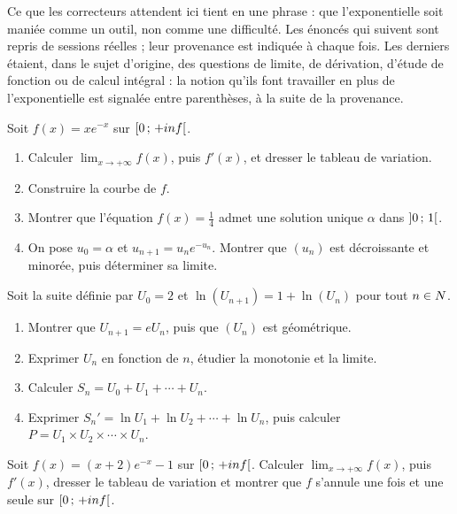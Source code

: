 \begin{annales}
Ce que les correcteurs attendent ici tient en une phrase : que l'exponentielle
soit maniée comme un outil, non comme une difficulté. Les énoncés qui suivent
sont repris de sessions réelles ; leur provenance est indiquée à chaque fois.
Les derniers étaient, dans le sujet d'origine, des questions de limite, de
dérivation, d'étude de fonction ou de calcul intégral : la notion qu'ils font
travailler en plus de l'exponentielle est signalée entre parenthèses, à la
suite de la provenance.

Soit $f(x) = xe^{-x}$ sur $\left[0\,;\,+inf\right[$.
\begin{enumerate}[label=\textbf{\arabic*)}, leftmargin=*, itemsep=0.15em]
  \item Calculer $\lim_{x\to+\infty}f(x)$, puis $f'(x)$, et dresser le tableau
        de variation.
  \item Construire la courbe de $f$.
  \item Montrer que l'équation $f(x) = \frac14$ admet une solution unique
        $\alpha$ dans $\left]0\,;\,1\right[$.
  \item On pose $u_{0} = \alpha$ et $u_{n+1} = u_{n}e^{-u_{n}}$. Montrer que
        $(u_{n})$ est décroissante et minorée, puis déterminer sa limite.
\end{enumerate}

Soit la suite définie par $U_{0} = 2$ et
$\ln\!\left(U_{n+1}\right) = 1+\ln\!\left(U_{n}\right)$ pour tout
$n\in N$.
\begin{enumerate}[label=\textbf{\arabic*)}, leftmargin=*, itemsep=0.15em]
  \item Montrer que $U_{n+1} = eU_{n}$, puis que $(U_{n})$ est géométrique.
  \item Exprimer $U_{n}$ en fonction de $n$, étudier la monotonie et la limite.
  \item Calculer $S_{n} = U_{0}+U_{1}+\cdots+U_{n}$.
  \item Exprimer $S_{n}' = \ln U_{1}+\ln U_{2}+\cdots+\ln U_{n}$, puis
        calculer $P = U_{1}\times U_{2}\times\cdots\times U_{n}$.
\end{enumerate}

Soit $f(x) = (x+2)e^{-x}-1$ sur $\left[0\,;\,+inf\right[$. Calculer
$\lim_{x\to+\infty}f(x)$, puis $f'(x)$, dresser le tableau de variation et
montrer que $f$ s'annule une fois et une seule sur
$\left[0\,;\,+inf\right[$.


\end{annales}
